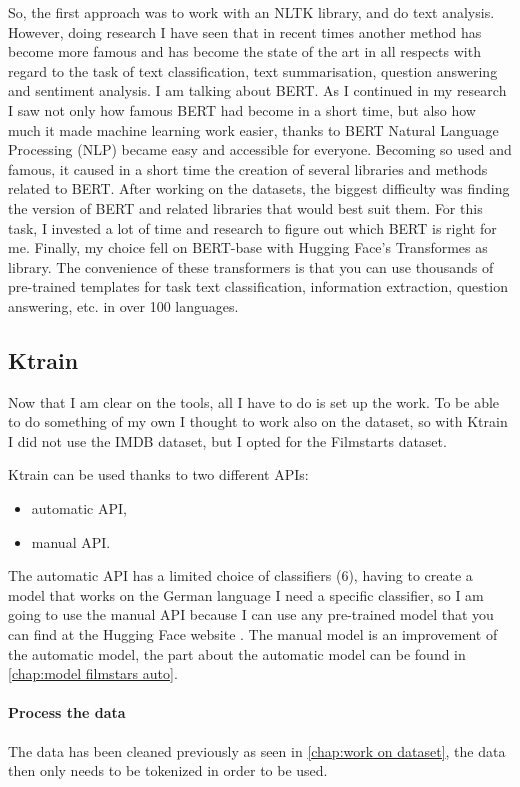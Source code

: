 So, the first approach was to work with an NLTK library, and do text analysis.
However, doing research I have seen that in recent times another method has become more famous and has become the state of the art in all respects with regard to the task of text classification, text summarisation, question answering and sentiment analysis.
I am talking about BERT.
As I continued in my research I saw not only how famous BERT had become in a short time, but also how much it made machine learning work easier, thanks to BERT Natural Language Processing (NLP) became easy and accessible for everyone.
Becoming so used and famous, it caused in a short time the creation of several libraries and methods related to BERT.
After working on the datasets, the biggest difficulty was finding the version of BERT and related libraries that would best suit them.
For this task, I invested a lot of time and research to figure out which BERT is right for me.
Finally, my choice fell on BERT-base with Hugging Face's Transformes as library.
The convenience of these transformers is that you can use thousands of pre-trained templates for task text classification, information extraction, question answering, etc. in over 100 languages.

\subsection{Ktrain}
\label{chap:Ktrain model}
Now that I am clear on the tools, all I have to do is set up the work.
To be able to do something of my own I thought to work also on the dataset, so with Ktrain I did not use the IMDB dataset, but I opted for the Filmstarts dataset.

Ktrain can be used thanks to two different APIs:
\begin{itemize}
    \item automatic API,
    \item manual API.
\end{itemize}

The automatic API has a limited choice of classifiers (6), having to create a model that works on the German language I need a specific classifier, so I am going to use the manual API because I can use any pre-trained model that you can find at the Hugging Face website \cite{noauthor_hugging_nodate}.
The manual model is an improvement of the automatic model, the part about the automatic model can be found in \autoref{chap:model filmstars auto}.


\paragraph{Process the data}
The data has been cleaned previously as seen in \autoref{chap:work on dataset}, the data then only needs to be tokenized in order to be used.  


